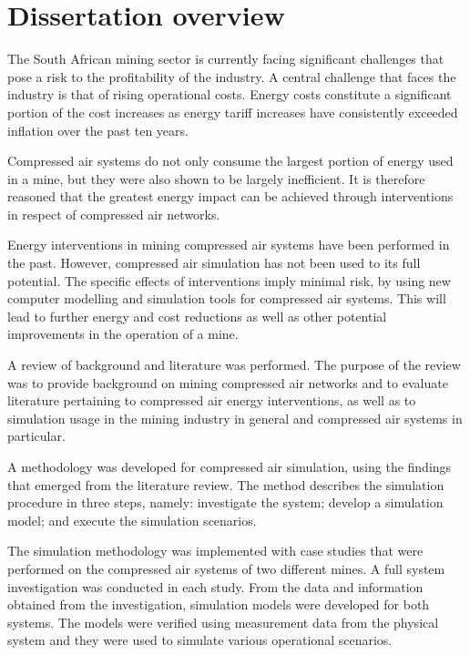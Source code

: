 	 \section{Dissertation overview}
		The South African mining sector is currently facing significant challenges that pose a risk to the profitability of the industry. A central challenge that faces the industry is that of rising operational costs. Energy costs constitute a significant portion of the cost increases as energy tariff increases have consistently exceeded inflation over the past ten years.
	 \par
		Compressed air systems do not only consume the largest portion of energy used in a mine, but they were also shown to be largely inefficient. It is therefore reasoned that the greatest energy impact can be achieved through interventions in respect of compressed air networks.
	 \par 
		Energy interventions in mining compressed air systems have been performed in the past. However, compressed air simulation has not been used to its full potential. The specific effects of interventions imply minimal risk, by using new computer modelling and simulation tools for compressed air systems. This will lead to further energy and cost reductions as well as other potential improvements in the operation of a mine.
	 \par 
	 A review of background and literature was performed. The purpose of the review was to provide background on mining compressed air networks and to evaluate literature pertaining to compressed air energy interventions, as well as to simulation usage in the mining industry in general and compressed air systems in particular.
	 \par 
		A methodology was developed for compressed air simulation, using the findings that emerged from the literature review. The method describes the simulation procedure in three steps, namely: investigate the system; develop a simulation model; and execute the simulation scenarios.
	 \par 
The simulation methodology was implemented with case studies that were performed on the compressed air systems of two different mines. A full system investigation was conducted in each study. From the data and information obtained from the investigation, simulation models were developed for both systems. The models were verified using measurement data from the physical system and they were used to simulate various operational scenarios.
	 \par 
